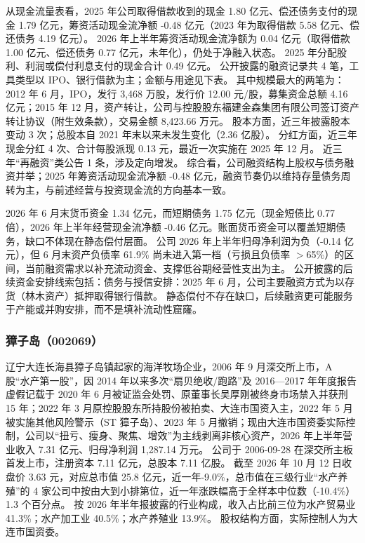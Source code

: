  从现金流量表看，2025 年公司取得借款收到的现金 1.80 亿元、偿还债务支付的现金 1.79 亿元，筹资活动现金流净额 -0.48 亿元（2023 年为取得借款 5.58 亿元、偿还债务 4.19 亿元）。 2026 年上半年筹资活动现金流净额为 0.04 亿元（取得借款 1.00 亿元、偿还债务 0.77 亿元，未年化），仍处于净融入状态。 2025 年分配股利、利润或偿付利息支付的现金合计 0.49 亿元。 公开披露的融资记录共 4 笔，工具类型以 IPO、银行借款为主；金额与用途见下表。 其中规模最大的两笔为：2012 年 6 月，IPO，发行 3,468 万股，发行价 12.00 元/股，募集资金总额 4.16 亿元；2015 年 12 月，资产转让，公司与控股股东福建金森集团有限公司签订资产转让协议（附生效条款），交易金额 8,423.66 万元。 股本方面，近三年披露股本变动 3 次；总股本自 2021 年末以来未发生变化（2.36 亿股）。 分红方面，近三年现金分红 4 次、合计每股派现 0.13 元，最近一次实施在 2025 年 12 月。 近三年“再融资”类公告 1 条，涉及定向增发。 综合看，公司融资结构上股权与债务融资并举；2025 年筹资活动现金流净额 -0.48 亿元，融资节奏仍以维持存量债务周转为主，与前述经营与投资现金流的方向基本一致。

 2026 年 6 月末货币资金 1.34 亿元，而短期债务 1.75 亿元（现金短债比 0.77 倍），2026 年上半年经营现金流净额 -0.46 亿元。账面货币资金可以覆盖短期债务，缺口不体现在静态偿付层面。 公司 2026 年上半年归母净利润为负（-0.14 亿元），但 6 月末资产负债率 61.9\% 尚未进入第一档（亏损且负债率 $>$65\%）的区间，当前融资需求以补充流动资金、支撑低谷期经营性支出为主。 公开披露的后续资金安排线索包括：债务与授信安排：2025 年 6 月，公司主要融资方式为以存货（林木资产）抵押取得银行借款。 静态偿付不存在缺口，后续融资更可能服务于产能或并购安排，而不是填补流动性窟窿。




\subsubsection{獐子岛（002069）}
\label{co:002069}

 辽宁大连长海县獐子岛镇起家的海洋牧场企业，2006 年 9 月深交所上市，A 股“水产第一股”，因 2014 年以来多次“扇贝绝收/跑路”及 2016—2017 年年度报告虚假记载于 2020 年 6 月被证监会处罚、原董事长吴厚刚被终身市场禁入并获刑 15 年；2022 年 3 月原控股股东所持股份被拍卖、大连市国资入主，2022 年 5 月被实施其他风险警示（ST 獐子岛）、2023 年 5 月撤销；现由大连市国资委实际控制，公司以“扭亏、瘦身、聚焦、增效”为主线剥离非核心资产，2026 年上半年营业收入 7.31 亿元、归母净利润 1,287.14 万元。 公司于 2006-09-28 在深交所主板首发上市，注册资本 7.11 亿元，总股本 7.11 亿股。 截至 2026 年 10 月 12 日收盘价 3.63 元，对应总市值 25.8 亿元，近一年-9.0\%，总市值在三级行业“水产养殖”的 4 家公司中按由大到小排第位，近一年涨跌幅高于全样本中位数（-10.4\%）1.3 个百分点。 按 2026 年半年报披露的行业构成，收入占比前三位为水产贸易业 41.3\%；水产加工业 40.5\%；水产养殖业 13.9\%。 股权结构方面，实际控制人为大连市国资委。

